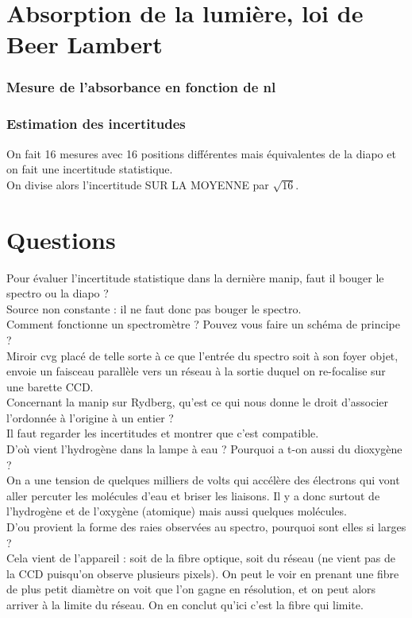 \documentclass[12pt,prb,aps,epsf]{article}
\begin{document}
\section{Absorption de la lumière, loi de Beer Lambert}

\subsubsection{Mesure de l'absorbance en fonction de nl}

\subsubsection{Estimation des incertitudes}
On fait 16 mesures avec 16 positions différentes mais équivalentes de la diapo et on fait une incertitude statistique.\\
On divise alors l'incertitude SUR LA MOYENNE par $\sqrt{16}$.


\section*{Questions}
Pour évaluer l'incertitude statistique dans la dernière manip, faut il bouger le spectro ou la diapo ?\\
Source non constante : il ne faut donc pas bouger le spectro.\\

Comment fonctionne un spectromètre ? Pouvez vous faire un schéma de principe ?\\
Miroir cvg placé de telle sorte à ce que l'entrée du spectro soit à son foyer objet, envoie un faisceau parallèle vers un réseau à la sortie duquel on re-focalise sur une barette CCD.\\

Concernant la manip sur Rydberg, qu'est ce qui nous donne le droit d'associer l'ordonnée à l'origine à un entier ?\\
Il faut regarder les incertitudes et montrer que c'est compatible.\\

D'où vient l'hydrogène dans la lampe à eau ? Pourquoi a t-on aussi du dioxygène ?\\
On a une tension de quelques milliers de volts qui accélère des électrons qui vont aller percuter les molécules d'eau et briser les liaisons. Il y a donc surtout de l'hydrogène et de l'oxygène (atomique) mais aussi quelques molécules.\\

D'ou provient la forme des raies observées au spectro, pourquoi sont elles si larges ?\\
Cela vient de l'appareil : soit de la fibre optique, soit du réseau (ne vient pas de la CCD puisqu'on observe plusieurs pixels). On peut le voir en prenant une fibre de plus petit diamètre on voit que l'on gagne en résolution, et on peut alors arriver à la limite du réseau. On en conclut qu'ici c'est la fibre qui limite.\\
\end{document}
